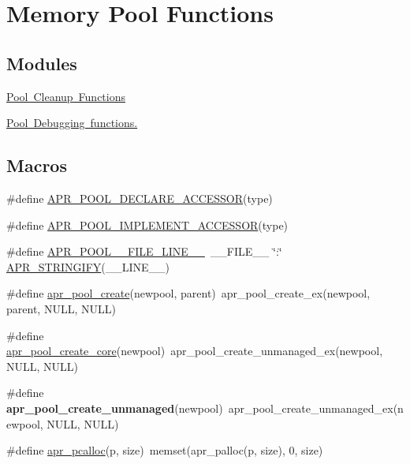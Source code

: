 \hypertarget{group__apr__pools}{}\section{Memory Pool Functions}
\label{group__apr__pools}
\subsection*{Modules}
\begin{DoxyCompactItemize}
\item 
\mbox{\hyperlink{group___pool_cleanup}{Pool Cleanup Functions}}
\item 
\mbox{\hyperlink{group___pool_debug}{Pool Debugging functions.}}
\end{DoxyCompactItemize}
\subsection*{Macros}
\begin{DoxyCompactItemize}
\item 
\#define \mbox{\hyperlink{group__apr__pools_ga89ce1d55c7f0c39ea87c88eabd655394}{A\+P\+R\+\_\+\+P\+O\+O\+L\+\_\+\+D\+E\+C\+L\+A\+R\+E\+\_\+\+A\+C\+C\+E\+S\+S\+OR}}(type)
\item 
\#define \mbox{\hyperlink{group__apr__pools_ga43a8a52f68f8b7d3b7694c254da4a074}{A\+P\+R\+\_\+\+P\+O\+O\+L\+\_\+\+I\+M\+P\+L\+E\+M\+E\+N\+T\+\_\+\+A\+C\+C\+E\+S\+S\+OR}}(type)
\item 
\#define \mbox{\hyperlink{group__apr__pools_gac81cff34d0ff4be52fa924663478eade}{A\+P\+R\+\_\+\+P\+O\+O\+L\+\_\+\+\_\+\+F\+I\+L\+E\+\_\+\+L\+I\+N\+E\+\_\+\+\_\+}}~\+\_\+\+\_\+\+F\+I\+L\+E\+\_\+\+\_\+ \char`\"{}\+:\char`\"{} \mbox{\hyperlink{apr__version_8h_ae90215615972dfa4108018304361ef0b}{A\+P\+R\+\_\+\+S\+T\+R\+I\+N\+G\+I\+FY}}(\+\_\+\+\_\+\+L\+I\+N\+E\+\_\+\+\_\+)
\item 
\#define \mbox{\hyperlink{group__apr__pools_gaa7c40921aae156b665e82b0a66991a39}{apr\+\_\+pool\+\_\+create}}(newpool,  parent)~apr\+\_\+pool\+\_\+create\+\_\+ex(newpool, parent, N\+U\+LL, N\+U\+LL)
\item 
\#define \mbox{\hyperlink{group__apr__pools_gac5b45d10dd235432a214079792714226}{apr\+\_\+pool\+\_\+create\+\_\+core}}(newpool)~apr\+\_\+pool\+\_\+create\+\_\+unmanaged\+\_\+ex(newpool, N\+U\+LL, N\+U\+LL)
\item 
\mbox{\label{group__apr__pools_ga03a06feb239bed9edd79a4f59679d56b}} 
\#define {\bfseries apr\+\_\+pool\+\_\+create\+\_\+unmanaged}(newpool)~apr\+\_\+pool\+\_\+create\+\_\+unmanaged\+\_\+ex(newpool, N\+U\+LL, N\+U\+LL)
\item 
\#define \mbox{\hyperlink{group__apr__pools_gad214fc0160de3c22b6435e29ea20fce8}{apr\+\_\+pcalloc}}(p,  size)~memset(apr\+\_\+palloc(p, size), 0, size)
\end{DoxyCompactItemize}
